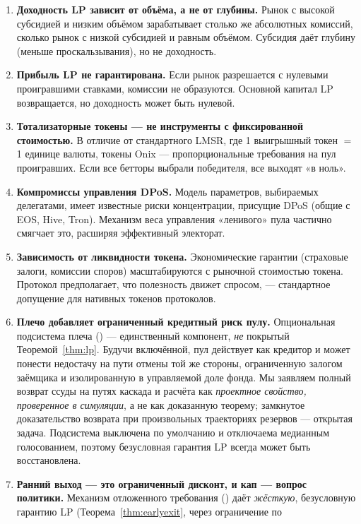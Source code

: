 \documentclass{ledger}
\theoremstyle{plain}
\theoremstyle{remark}
\begin{document}
\begin{enumerate}
  \item \textbf{Доходность LP зависит от объёма, а не от глубины.} Рынок с высокой
  субсидией и низким объёмом зарабатывает столько же абсолютных комиссий, сколько
  рынок с низкой субсидией и равным объёмом. Субсидия даёт глубину (меньше
  проскальзывания), но не доходность.
  \item \textbf{Прибыль LP не гарантирована.} Если рынок разрешается с нулевыми
  проигравшими ставками, комиссии не образуются. Основной капитал LP возвращается, но
  доходность может быть нулевой.
  \item \textbf{Тотализаторные токены --- не инструменты с фиксированной стоимостью.}
  В отличие от стандартного LMSR, где 1 выигрышный токен $=$ 1 единице валюты, токены
  Onix --- пропорциональные требования на пул проигравших. Если все бетторы выбрали
  победителя, все выходят «в ноль».
  \item \textbf{Компромиссы управления DPoS.} Модель параметров, выбираемых
  делегатами, имеет известные риски концентрации, присущие DPoS (общие с EOS, Hive,
  Tron). Механизм веса управления «ленивого» пула частично смягчает это, расширяя
  эффективный электорат.
  \item \textbf{Зависимость от ликвидности токена.} Экономические гарантии (страховые
  залоги, комиссии споров) масштабируются с рыночной стоимостью токена. Протокол
  предполагает, что полезность движет спросом, --- стандартное допущение для нативных
  токенов протоколов.
  \item \textbf{Плечо добавляет ограниченный кредитный риск пулу.} Опциональная
  подсистема плеча () --- единственный компонент, \emph{не}
  покрытый Теоремой~\ref{thm:lp}. Будучи включённой, пул действует как кредитор и
  может понести недостачу на пути отмены той же стороны, ограниченную залогом заёмщика
  и изолированную в управляемой доле фонда. Мы заявляем полный возврат ссуды на путях
  каскада и расчёта как \emph{проектное свойство, проверенное в симуляции}, а не как
  доказанную теорему; замкнутое доказательство возврата при произвольных траекториях
  резервов --- открытая задача. Подсистема выключена по умолчанию и отключаема
  медианным голосованием, поэтому безусловная гарантия LP всегда может быть
  восстановлена.
  \item \textbf{Ранний выход --- это ограниченный дисконт, и кап --- вопрос политики.}
  Механизм отложенного требования () даёт \emph{жёсткую},
  безусловную гарантию LP (Теорема~\ref{thm:earlyexit}, через ограничение по

\end{enumerate}
\end{document}
